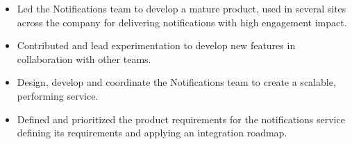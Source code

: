\documentclass[10pt,a4paper]{altacv}
\begin{document}


\begin{fullwidth}
\makecvheader
\end{fullwidth}


\begin{itemize}
	\item Led the Notifications team to develop a mature product, used in several sites across the company for delivering notifications with high engagement impact.
	\item Contributed and lead experimentation to develop new features in collaboration with other teams.
\end{itemize}

\divider

\begin{itemize}
	\item Design, develop and coordinate the Notifications team to create a scalable, performing service.
	\item Defined and prioritized the product requirements for the notifications service defining its requirements and applying an integration roadmap.
\end{itemize}

\divider

\end{document}
